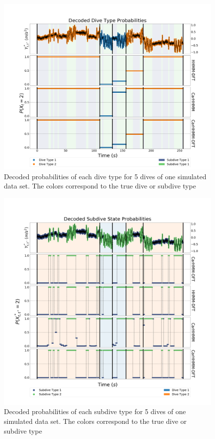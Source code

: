 \begin{figure}[ht]
    \centering
    \includegraphics[width=5in]{../Plots/Posterior_Coarse_States.png}
    \caption{Decoded probabilities of each dive type for 5 dives of one simulated data set. The colors correspond to the true dive or subdive type}
    \label{fig:acc_coarse}
\end{figure}

\begin{figure}[ht]
    \centering
    \includegraphics[width=5in]{../Plots/Posterior_Fine_States.png}
    \caption{Decoded probabilities of each subdive type for 5 dives of one simulated data set. The colors correspond to the true dive or subdive type}
    \label{fig:acc_fine}
\end{figure}

